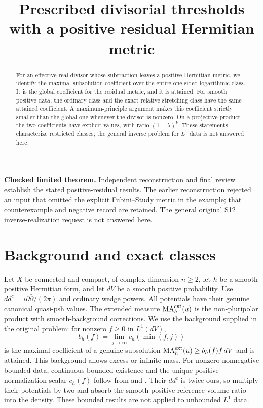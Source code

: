 \documentclass[11pt]{article}
\title{Prescribed divisorial thresholds with a positive residual Hermitian metric}
\author{}\date{}
\newcommand{\ddc}{dd^c}
\newcommand{\MA}{\operatorname{MA}}
\theoremstyle{remark}\newtheorem{remark}[theorem]{Remark}
\begin{document}
\maketitle
\begin{abstract}
For an effective real divisor whose subtraction leaves a positive
Hermitian metric, we identify the maximal subsolution coefficient over
the entire one-sided logarithmic class. It is the global coefficient for
the residual metric, and it is attained. For smooth positive data, the
ordinary class and the exact relative stretching class have the same
attained coefficient. A maximum-principle argument makes this coefficient
strictly smaller than the global one whenever the divisor is nonzero.
On a projective product the two coefficients have explicit values, with
ratio $(1-\lambda)^k$. These statements characterize restricted classes;
the general inverse problem for $L^1$ data is not answered here.
\end{abstract}
\noindent\textbf{Checked limited theorem.} Independent reconstruction and
final review establish the stated positive-residual results. The earlier
reconstruction rejected an input that omitted the explicit Fubini--Study
metric in the example; that counterexample and negative record are retained.
The general original S12 inverse-realization request is not answered here.

\section{Background and exact classes}
Let $X$ be connected and compact, of complex dimension $n\geq2$, let $h$
be a smooth positive Hermitian form, and let $dV$ be a smooth positive
probability. Use $\ddc=i\partial\bar\partial/(2\pi)$ and ordinary wedge
powers. All potentials have their genuine canonical quasi-psh values.
The extended measure $\MA_h^{\rm ext}(u)$ is the non-pluripolar product
with smooth-background corrections. We use the background supplied in
the original problem: for nonzero $f\geq0$ in $L^1(dV)$,
\[
 b_h(f)=\lim_{j\to\infty}c_h(\min(f,j))
\]
is the maximal coefficient of a genuine subsolution
$\MA_h^{\rm ext}(u)\geq b_h(f)f\,dV$ and is attained. This background
allows excess or infinite mass. For nonzero nonnegative bounded data,
continuous bounded existence and the unique positive normalization
scalar $c_h(f)$ follow from \cite[Theorem 0.1]{KN} and
\cite[Corollary 0.2]{Ng}. Their $\ddc$ is twice ours, so multiply
their potentials by two and absorb the smooth positive reference-volume
ratio into the density. These bounded results are not applied to
unbounded $L^1$ data.
\end{document}
